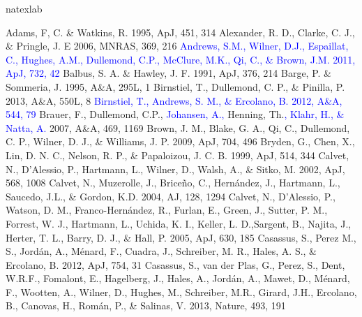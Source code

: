 \documentclass[apj]{emulateapj}
\def\blue#1{\textcolor{blue}{#1}}
\begin{document}
\begin{thebibliography}{}
\expandafter\ifx\csname natexlab\endcsname\relax\def\natexlab#1{#1}\fi

 Adams, F, C. \& Watkins, R. 1995, ApJ, 451, 314
 Alexander, R. D., Clarke, C. J., \& Pringle, J. E 2006, MNRAS, 369, 216
\bibitem[{{\blue{Andrews et al.}}(2011)}]{Andrews11} \blue{Andrews, S.M., Wilner, D.J., Espaillat, C., Hughes, A.M., Dullemond, C.P., McClure, M.K., Qi, C., \& Brown, J.M. 2011, ApJ, 732, 42} 
 Balbus, S. A. \&  Hawley, J. F. 1991, ApJ, 376, 214
 Barge, P. \&  Sommeria, J. 1995, A\&A, 295L, 1
 Birnstiel, T., Dullemond, C. P., \& Pinilla, P. 2013, A\&A, 550L, 8
\bibitem[{{\blue{Birnstiel et al.}}(2012)}]{Birnstiel12} \blue{Birnstiel, T., Andrews, S. M., \& Ercolano, B. 2012, A\&A, 544, 79}
 Brauer, F., Dullemond, C.P., \blue{Johansen, A.,} Henning, Th.\blue{, Klahr, H., \& Natta, A.} 2007, A\&A, 469, 1169
 Brown, J. M., Blake, G. A., Qi, C., Dullemond, C. P., Wilner, D. J., \& Williams, J. P. 2009, ApJ, 704, 496
 Bryden, G., Chen, X., Lin, D. N. C., Nelson, R. P., \& Papaloizou, J. C. B. 1999, ApJ, 514, 344
 Calvet, N., D'Alessio, P., Hartmann, L., Wilner, D., Walsh, A., \& Sitko, M. 2002, ApJ, 568, 1008
 Calvet, N., Muzerolle, J., Brice\~no, C.,  Hern\'andez, J., Hartmann, L., Saucedo, J.L., \& Gordon, K.D. 2004, AJ, 128, 1294
 Calvet, N., D'Alessio, P., Watson, D. M., Franco-Hern\'andez, R., Furlan, E., Green, J., Sutter, P. M., Forrest, W. J., Hartmann, L., Uchida, K. I., Keller, L. D.,Sargent, B., Najita, J., Herter, T. L., Barry, D. J., \& Hall, P. 2005, ApJ, 630, 185
 Casassus, S., Perez M., S., Jord\'an, A., M\'enard, F., Cuadra, J., Schreiber, M. R., Hales, A. S., \& Ercolano, B. 2012, ApJ, 754, 31
 Casassus, S., van der Plas, G., Perez, S., Dent, W.R.F., Fomalont, E., Hagelberg, J., Hales, A., Jord\'an, A., Mawet, D., M\'enard, F., Wootten, A., Wilner, D., Hughes, M., Schreiber, M.R., Girard, J.H., Ercolano, B., Canovas, H., Rom\'an, P., \& Salinas, V. 2013, Nature, 493, 191

\end{thebibliography}
\end{document}
